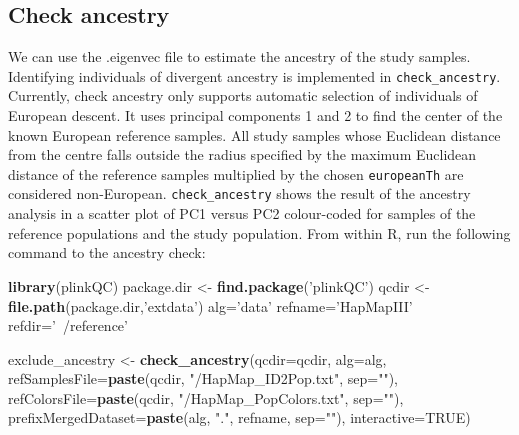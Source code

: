 \documentclass[]{article}
\newenvironment{Shaded}{}{}
\newcommand{\KeywordTok}[1]{\textcolor[rgb]{0.00,0.44,0.13}{\textbf{#1}}}
\newcommand{\DataTypeTok}[1]{\textcolor[rgb]{0.56,0.13,0.00}{#1}}
\newcommand{\StringTok}[1]{\textcolor[rgb]{0.25,0.44,0.63}{#1}}
\newcommand{\OtherTok}[1]{\textcolor[rgb]{0.00,0.44,0.13}{#1}}
\newcommand{\NormalTok}[1]{#1}
\begin{document}
\subsection{Check ancestry}\label{check-ancestry}

We can use the .eigenvec file to estimate the ancestry of the study
samples. Identifying individuals of divergent ancestry is implemented in
\texttt{check\_ancestry}. Currently, check ancestry only supports
automatic selection of individuals of European descent. It uses
principal components 1 and 2 to find the center of the known European
reference samples. All study samples whose Euclidean distance from the
centre falls outside the radius specified by the maximum Euclidean
distance of the reference samples multiplied by the chosen
\texttt{europeanTh} are considered non-European.
\texttt{check\_ancestry} shows the result of the ancestry analysis in a
scatter plot of PC1 versus PC2 colour-coded for samples of the reference
populations and the study population. From within R, run the following
command to the ancestry check:

\begin{Shaded}
\begin{Highlighting}[]
\KeywordTok{library}\NormalTok{(plinkQC)}
\NormalTok{package.dir <-}\StringTok{ }\KeywordTok{find.package}\NormalTok{(}\StringTok{'plinkQC'}\NormalTok{)}
\NormalTok{qcdir <-}\StringTok{ }\KeywordTok{file.path}\NormalTok{(package.dir,}\StringTok{'extdata'}\NormalTok{)}
\NormalTok{alg=}\StringTok{'data'}
\NormalTok{refname=}\StringTok{'HapMapIII'}
\NormalTok{refdir=}\StringTok{'~/reference'}


\NormalTok{exclude_ancestry <-}\StringTok{ }\KeywordTok{check_ancestry}\NormalTok{(}\DataTypeTok{qcdir=}\NormalTok{qcdir, }\DataTypeTok{alg=}\NormalTok{alg,}
                            \DataTypeTok{refSamplesFile=}\KeywordTok{paste}\NormalTok{(qcdir, }\StringTok{"/HapMap_ID2Pop.txt"}\NormalTok{,}
                                                 \DataTypeTok{sep=}\StringTok{""}\NormalTok{), }
                            \DataTypeTok{refColorsFile=}\KeywordTok{paste}\NormalTok{(qcdir, }\StringTok{"/HapMap_PopColors.txt"}\NormalTok{,}
                                                 \DataTypeTok{sep=}\StringTok{""}\NormalTok{),}
                            \DataTypeTok{prefixMergedDataset=}\KeywordTok{paste}\NormalTok{(alg, }\StringTok{"."}\NormalTok{, refname,}
                                                      \DataTypeTok{sep=}\StringTok{""}\NormalTok{),}
                            \DataTypeTok{interactive=}\OtherTok{TRUE}\NormalTok{)}
\end{Highlighting}
\end{Shaded}
\end{document}
